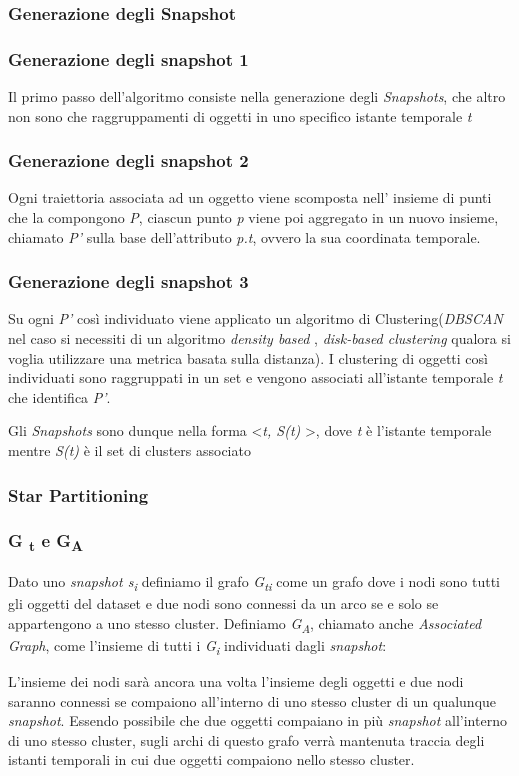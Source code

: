 \documentclass{beamer}
\begin{document}
\subsubsection{Generazione degli Snapshot}

\begin{frame}
	\frametitle{Generazione degli snapshot 1}
	Il primo passo dell'algoritmo consiste nella generazione degli \textit{Snapshots}, che altro non sono che raggruppamenti di oggetti in uno specifico istante temporale \textit{t}
	
\end{frame}

\begin{frame}
	\frametitle{Generazione degli snapshot 2}
	Ogni traiettoria associata ad un oggetto viene scomposta nell' insieme di punti che la compongono \textit{P}, ciascun punto \textit{p} viene poi aggregato in un nuovo insieme, chiamato \textit{P'} sulla base dell'attributo \textit{p.t}, ovvero la sua coordinata temporale.
	
	
\end{frame}

\begin{frame}
	\frametitle{Generazione degli snapshot 3}
	Su ogni \textit{P'} così individuato viene applicato un algoritmo di Clustering(\textit{DBSCAN}
	nel caso si necessiti di un algoritmo \textit{density based }, \textit{disk-based clustering} qualora si voglia utilizzare una metrica basata sulla distanza).
	I clustering di oggetti così individuati sono raggruppati in un set e vengono associati all'istante temporale \textit{t} che identifica \textit{P'}.
	
	Gli \textit{Snapshots} sono dunque nella forma \textless \textit{t, S(t)} \textgreater, dove \textit{t} è l'istante temporale mentre \textit{S(t)} è il set di clusters associato 
\end{frame}

\subsubsection{Star Partitioning}

\begin{frame}
	\frametitle{G \textsubscript{t} e G\textsubscript{A}}
Dato uno \textit{snapshot s\textsubscript{i}} definiamo il grafo \textit{G\textsubscript{ti}} come un grafo dove i nodi sono tutti gli oggetti del dataset e due nodi sono connessi da un arco se e solo se appartengono a uno stesso cluster.
Definiamo \textit{G\textsubscript{A}}, chiamato anche \textit{Associated Graph}, come l'insieme di tutti i \textit{G\textsubscript{i}} individuati dagli \textit{snapshot}:

L'insieme dei nodi sarà ancora una volta l'insieme degli oggetti e due nodi saranno connessi se compaiono all'interno di uno stesso cluster di un qualunque \textit{snapshot}.
Essendo possibile che due oggetti compaiano in più \textit{snapshot} all'interno di uno stesso cluster, sugli archi di questo grafo verrà mantenuta traccia degli istanti temporali in cui due oggetti compaiono nello stesso cluster. 
\end{frame}
\end{document}
